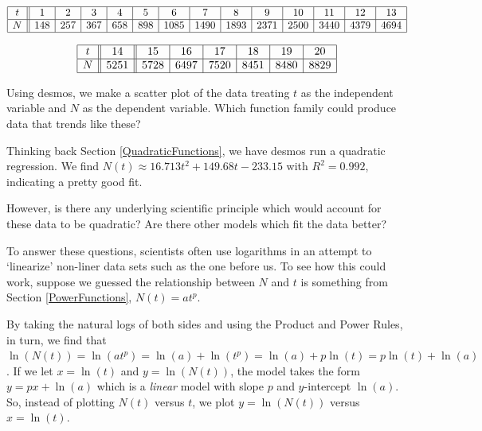 \documentclass{ximera}
\begin{document}
\[ \begin{array}{|c||c|c|c|c|c|c|c|c|c|c|c|c|c|}  \hline

t & 1 & 2 & 3 & 4 & 5 & 6 & 7 & 8 & 9 & 10 & 11 & 12 & 13  \\ \hline

N & 148 & 257 &   367 & 658 & 898 & 1085 & 1490 & 1893 & 2371 & 2500 & 3440 & 4379 & 4694  \\ \hline \end{array} \]


\[\begin{array}{|c||c||c|c|c|c|c|c|} \hline

t & 14 & 15 & 16 & 17 & 18 & 19& 20  \\ \hline 

N & 5251 & 5728 & 6497 & 7520 & 8451 & 8480 & 8829    \\ \hline \end{array} \]

Using desmos, we make a scatter plot of the data treating $t$ as the independent variable and $N$ as the dependent variable.   Which function family could produce data that trends like these?

Thinking back Section \ref{QuadraticFunctions}, we have desmos run a quadratic regression.  We find $N(t) \approx 16.713 t^2 +149.68t -233.15$ with $R^2 = 0.992$, indicating a pretty good fit.  

\begin{center}
\end{center}

However, is there any underlying scientific principle which would account for these data to be quadratic?  Are there other models which fit the data  better?


To answer these questions, scientists often use logarithms in an attempt to `linearize' non-liner data sets such as the one before us.  To see how this could work, suppose we guessed the relationship between $N$ and $t$ is something from Section \ref{PowerFunctions},  $N(t) = a t^{p}$.  


By taking the natural logs of both sides and using the Product and Power Rules, in turn, we find that $\ln(N(t)) = \ln(a t^p) = \ln(a) + \ln(t^p) = \ln(a) + p \ln(t) =  p \ln(t) + \ln(a)$.   If we let  $x = \ln(t)$ and $y= \ln(N(t))$,  the model takes the form $y = p x + \ln(a)$ which is a \textit{linear} model with slope $p$ and $y$-intercept $\ln(a)$.  So, instead of plotting $N(t)$ versus $t$, we plot $y=\ln(N(t))$ versus $x=\ln(t)$. 
\end{document}
